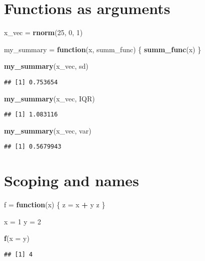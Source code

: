 \documentclass[
]{article}
\newenvironment{Shaded}{\begin{snugshade}}{\end{snugshade}}
\newcommand{\AttributeTok}[1]{\textcolor[rgb]{0.13,0.29,0.53}{#1}}
\newcommand{\ControlFlowTok}[1]{\textcolor[rgb]{0.13,0.29,0.53}{\textbf{#1}}}
\newcommand{\DecValTok}[1]{\textcolor[rgb]{0.00,0.00,0.81}{#1}}
\newcommand{\FunctionTok}[1]{\textcolor[rgb]{0.13,0.29,0.53}{\textbf{#1}}}
\newcommand{\NormalTok}[1]{#1}
\newcommand{\OtherTok}[1]{\textcolor[rgb]{0.56,0.35,0.01}{#1}}
\newcommand{\SpecialCharTok}[1]{\textcolor[rgb]{0.81,0.36,0.00}{\textbf{#1}}}
\begin{document}
\section{Functions as arguments}\label{functions-as-arguments}

\begin{Shaded}
\begin{Highlighting}[]
\NormalTok{x\_vec }\OtherTok{=} \FunctionTok{rnorm}\NormalTok{(}\DecValTok{25}\NormalTok{, }\DecValTok{0}\NormalTok{, }\DecValTok{1}\NormalTok{)}

\NormalTok{my\_summary }\OtherTok{=} \ControlFlowTok{function}\NormalTok{(x, summ\_func) \{}
  \FunctionTok{summ\_func}\NormalTok{(x)}
\NormalTok{\}}

\FunctionTok{my\_summary}\NormalTok{(x\_vec, sd)}
\end{Highlighting}
\end{Shaded}

\begin{verbatim}
## [1] 0.753654
\end{verbatim}

\begin{Shaded}
\begin{Highlighting}[]
\FunctionTok{my\_summary}\NormalTok{(x\_vec, IQR)}
\end{Highlighting}
\end{Shaded}

\begin{verbatim}
## [1] 1.083116
\end{verbatim}

\begin{Shaded}
\begin{Highlighting}[]
\FunctionTok{my\_summary}\NormalTok{(x\_vec, var)}
\end{Highlighting}
\end{Shaded}

\begin{verbatim}
## [1] 0.5679943
\end{verbatim}

\section{Scoping and names}\label{scoping-and-names}

\begin{Shaded}
\begin{Highlighting}[]
\NormalTok{f }\OtherTok{=} \ControlFlowTok{function}\NormalTok{(x) \{}
\NormalTok{  z }\OtherTok{=}\NormalTok{ x }\SpecialCharTok{+}\NormalTok{ y}
\NormalTok{  z}
\NormalTok{\}}

\NormalTok{x }\OtherTok{=} \DecValTok{1}
\NormalTok{y }\OtherTok{=} \DecValTok{2}

\FunctionTok{f}\NormalTok{(}\AttributeTok{x =}\NormalTok{ y)}
\end{Highlighting}
\end{Shaded}

\begin{verbatim}
## [1] 4
\end{verbatim}
\end{document}
